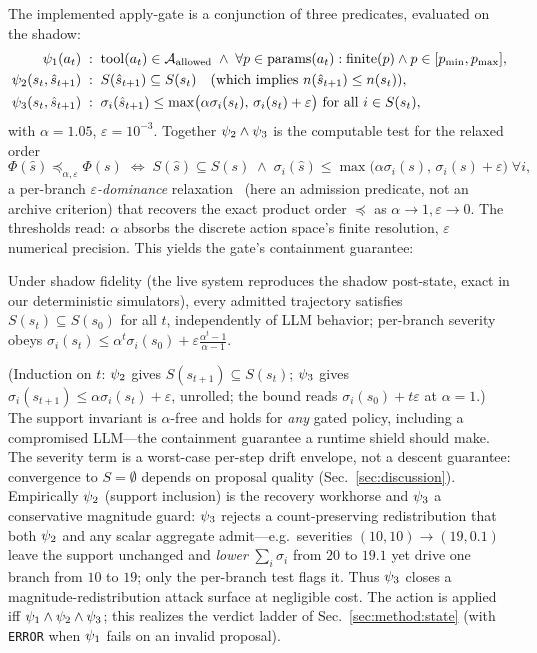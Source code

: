 The implemented apply-gate is a conjunction of three predicates, evaluated on the shadow:
\begin{align}
\psi_1(a_t)\;&:\;\mathrm{tool}(a_t)\in\mathcal{A}_{\text{allowed}}\;\wedge\;\forall p\in\mathrm{params}(a_t):\mathrm{finite}(p)\wedge p\in[p_{\min},p_{\max}], \\
\psi_2(s_t,\hat{s}_{t+1})\;&:\;S(\hat{s}_{t+1})\subseteq S(s_t)\quad(\text{which implies }n(\hat{s}_{t+1})\le n(s_t)), \\
\psi_3(s_t,\hat{s}_{t+1})\;&:\;\sigma_i(\hat{s}_{t+1})\le\max\bigl(\alpha\sigma_i(s_t),\,\sigma_i(s_t)+\varepsilon\bigr)\text{ for all }i\in S(s_t),
\end{align}
with $\alpha{=}1.05$, $\varepsilon{=}10^{-3}$. Together $\psi_2\wedge\psi_3$ is the computable test for the relaxed order
\begin{equation}
\Phi(\hat{s})\preceq_{\alpha,\varepsilon}\Phi(s)\;\iff\;S(\hat{s})\subseteq S(s)\;\wedge\;\sigma_i(\hat{s})\le\max\bigl(\alpha\sigma_i(s),\,\sigma_i(s)+\varepsilon\bigr)\;\forall i,
\end{equation}
a per-branch \emph{$\varepsilon$-dominance} relaxation~\cite{laumanns2002} (here an admission predicate, not an archive criterion) that recovers the exact product order $\preceq$ as $\alpha\to1,\varepsilon\to0$. The thresholds read: $\alpha$ absorbs the discrete action space's finite resolution, $\varepsilon$ numerical precision. This yields the gate's containment guarantee:
\begin{proposition}
\label{prop:inv}
Under shadow fidelity (the live system reproduces the shadow post-state, exact in our deterministic simulators), every admitted trajectory satisfies $S(s_t)\subseteq S(s_0)$ for all $t$, independently of LLM behavior; per-branch severity obeys $\sigma_i(s_t)\le\alpha^{t}\sigma_i(s_0)+\varepsilon\tfrac{\alpha^{t}-1}{\alpha-1}$.
\end{proposition}
\noindent(Induction on $t$: $\psi_2$ gives $S(s_{t+1})\subseteq S(s_t)$; $\psi_3$ gives $\sigma_i(s_{t+1})\le\alpha\sigma_i(s_t)+\varepsilon$, unrolled; the bound reads $\sigma_i(s_0)+t\varepsilon$ at $\alpha{=}1$.) The support invariant is $\alpha$-free and holds for \emph{any} gated policy, including a compromised LLM---the containment guarantee a runtime shield should make. The severity term is a worst-case per-step drift envelope, not a descent guarantee: convergence to $S=\emptyset$ depends on proposal quality (Sec.~\ref{sec:discussion}). Empirically $\psi_2$ (support inclusion) is the recovery workhorse and $\psi_3$ a conservative magnitude guard: $\psi_3$ rejects a count-preserving redistribution that both $\psi_2$ and any scalar aggregate admit---e.g.\ severities $(10,10)\!\to\!(19,0.1)$ leave the support unchanged and \emph{lower} $\sum_i\sigma_i$ from $20$ to $19.1$ yet drive one branch from $10$ to $19$; only the per-branch test flags it. Thus $\psi_3$ closes a magnitude-redistribution attack surface at negligible cost. The action is applied iff $\psi_1\wedge\psi_2\wedge\psi_3$; this realizes the verdict ladder of Sec.~\ref{sec:method:state} (with \texttt{ERROR} when $\psi_1$ fails on an invalid proposal).

